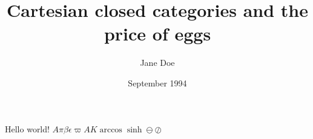 \documentclass{article}
\title{Cartesian closed categories and the price of eggs}
\author{Jane Doe}
\date{September 1994}
\begin{document}
   \maketitle
   Hello world! 
   $A \pi \beta \epsilon \varpi A K \arccos \sinh \ominus \oslash $
\end{document}
